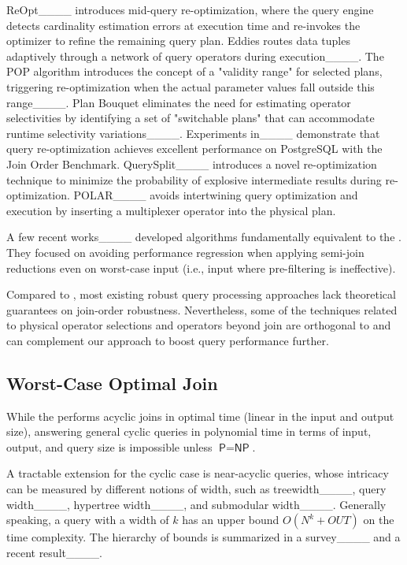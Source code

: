 ReOpt____ introduces mid-query re-optimization, where the query engine detects cardinality estimation errors at execution time and re-invokes the optimizer to refine the remaining query plan. Eddies routes data tuples adaptively through a network of query operators during execution____. The POP algorithm introduces the concept of a "validity range" for selected plans, triggering re-optimization when the actual parameter values fall outside this range____. Plan Bouquet eliminates the need for estimating operator selectivities by identifying a set of "switchable plans" that can accommodate runtime selectivity variations____. Experiments in____ demonstrate that query re-optimization achieves excellent performance on PostgreSQL with the Join Order Benchmark. QuerySplit____ introduces a novel re-optimization technique to minimize the probability of explosive intermediate results during re-optimization. POLAR____ avoids intertwining query optimization and execution by inserting a multiplexer operator into the physical plan.

A few recent works____ developed algorithms fundamentally equivalent to the \YannAlg. They focused on avoiding performance regression when applying semi-join reductions even on worst-case input (i.e., input where pre-filtering is ineffective).

Compared to \rpt, most existing robust query processing approaches lack theoretical guarantees on join-order robustness. Nevertheless, some of the techniques related to physical operator selections and operators beyond join are orthogonal to \rpt and can complement our approach to boost query performance further.

\subsection{Worst-Case Optimal Join}

While the \YannAlg performs acyclic joins in optimal time (linear in the input and output size), answering general cyclic queries in polynomial time in terms of input, output, and query size is impossible unless $\textsf{P}=\textsf{NP}$.

A tractable extension for the cyclic case is near-acyclic queries, whose intricacy can be measured by different notions of width, such as treewidth____, 
query width____, hypertree width____, and submodular width____. Generally speaking, a query with a width of $k$ has an upper bound $O(N^k+OUT)$ on the time complexity.
The hierarchy of bounds is summarized in a survey____ and a recent result____.


